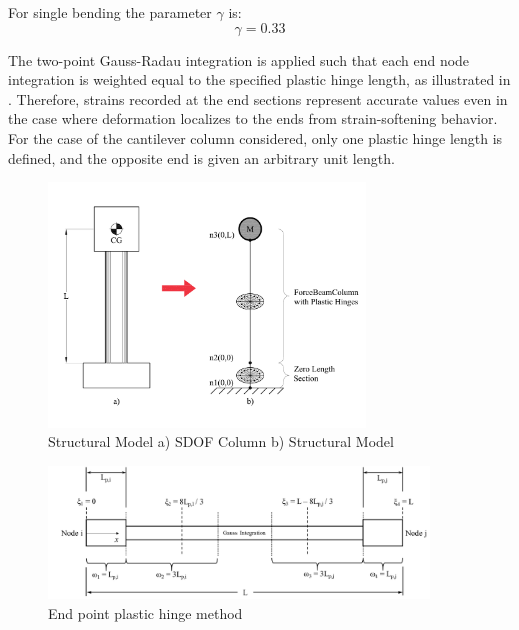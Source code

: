 For single bending the parameter $\gamma$ is:
\begin{equation}
    \gamma=0.33
    \label{eq:Gamma_LPt}
\end{equation}

The two-point Gauss-Radau integration is applied such that each end node integration is weighted equal to the specified plastic hinge length, as illustrated in . Therefore, strains recorded at the end sections represent accurate values even in the case where deformation localizes to the ends from strain-softening behavior. For the case of the cantilever column considered, only one plastic hinge length is defined, and the opposite end is given an arbitrary unit length. 

\begin{figure}[htbp]
	\centering
	\includegraphics[width=0.75\textwidth]{Chapter-4/figs/StructuralModel_01}
	\caption{Structural Model a) SDOF Column b) Structural Model}
	\label{fig:Structural_Model}
\end{figure}

\begin{figure}[htbp]
	\centering
	\includegraphics[width=0.9\textwidth]{Chapter-4/figs/fbc_PlasticHinge}
	\caption{End point plastic hinge method \cite{Scott}}
	\label{fig:Fiber_PlasticHinge}
\end{figure}

